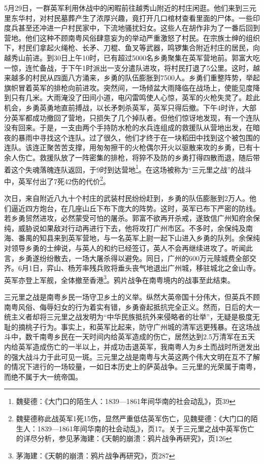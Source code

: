 5月29日，一群英军利用休战中的闲暇前往越秀山附近的村庄闲逛。他们来到三元里东华村，对村民墓葬产生了浓厚兴趣，竟打开几口棺材查看里面的尸体。一些印度兵甚至还冲进一户村民家中，下流地骚扰妇女。这些人在胡作非为了一番后回到营地。他们这种不顾南粤风俗肆意妄为的举动严重激怒了村民。在宗族士绅的组织下，村民们拿起火绳枪、长矛、刀棍、鱼叉等武器，鸣锣集合附近村庄的居民，向越秀山前进。到30日上午10时，已有超过5000名乡勇聚集在英军营地前。郭富大吃一惊，连忙备战，于下午1时派出一支分遣队进攻，将村民打退了5公里。这时，越来越多的村民从四面八方涌来，乡勇的队伍膨胀到7500人。乡勇们重整阵势，举起旗帜冒着英军的排枪向前进攻。突然间，一场倾盆大雨降临在战场上，使能见度降到只有几米。大雨淹没了田间小道，电闪雷鸣使人心惊，英军的火枪失灵了。趁此机会，乡勇英勇地直前搏战，以长矛刺杀英军，英军只得后撤。下午4时许，大部分英军都成功撤回了营地，只损失了几个掉队者。但他们惊讶地发现，有一个连队没有回来。于是，一支由两个手持防水枪的水兵连组成的救援队从营地出发，在暗夜的暴雨中寻找这个连队。过了很久，他们才终于在一块稻田中找到这个被包围的连队。该连正聚苦苦支撑，用匆匆擦干的火枪偶尔开火以驱散来攻的乡勇，已有十余人伤亡。救援队放了一阵密集的排枪，将猝不及防的乡勇打得四散而退，随后带着这个失魂落魄连队返回，于9时到达营地\footnote{魏斐德：《大门口的陌生人：1839—1861年间华南的社会动乱》，页39}。在这场被称为“三元里之战”的战斗中，英军付出了7死42伤的代价\footnote{魏斐德称此战英军1死15伤，显然严重低估英军伤亡，见魏斐德：《大门口的陌生人：1839—1861年间华南的社会动乱》，页17。关于三元里之战中英军伤亡的详尽分析，参见茅海建：《天朝的崩溃：鸦片战争再研究》，页126}。

次日，来自附近八九十个村庄的武装村民纷纷赶到，乡勇的队伍膨胀到2万人。他们逼近四方炮台，在几座山丘下布下庞大的阵势。这时，英军已布下严密的防线。若乡勇贸然进攻，必然蒙受可怕的屠杀。郭富不欲再开杀戒，遂致信广州知府余保纯，威胁说如果敌对行动再进行下去，他将攻打广州市区。不多时，余保纯及南海、番禺的知县来到英军营地，与一名英军上尉一起下山进入乡勇的队列。余保纯对领导乡勇的士绅说，与英人的和约已经签订，英人不会再继续进攻了。听闻此言，乡勇遂纷纷散去，一场大屠杀得以避免。同日，广州的600万元赎城费全部交齐。6月1日，弈山、杨芳率残兵败将垂头丧气地退出广州城，移驻城北之金山寺。英军亦登上军舰，全体撤至香港\footnote{茅海建：《天朝的崩溃：鸦片战争再研究》，页287}。鸦片战争在南粤境内的战事至此结束。

三元里之战是南粤乡民一场守卫乡土的义举。纵然大英帝国十分伟大，但英兵不顾南粤风俗、侮辱妇女的行为着实有错，乡勇奋起抵抗完全正义。然而，日后的大一统主义者却将三元里之战发明为“中华民族抵抗外来侵略者的壮举”，无疑是极度无耻的摘桃子行为。事实上，和英军比起来，防守广州城的清军远更残暴。在这场战斗中，数千南粤乡民在一天时间内给英军造成的伤亡，居然达到2.5万清军在五天内给英军造成伤亡的一半以上，并成功击退英军，我南粤人为乡土而战时所迸发出的强大战斗力于此可见一斑。三元里之战是南粤与大英这两个伟大文明在互不了解的情况下进行的一场较量，一如日本历史上的萨英战争。三元里的光荣属于南粤，而绝不属于大一统帝国。

